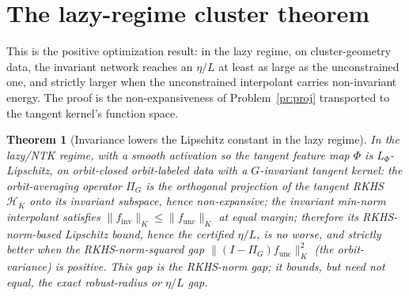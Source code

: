 \documentclass[11pt]{article}
\theoremstyle{plain}
\newtheorem{theorem}{Theorem}[section]
\theoremstyle{definition}
\theoremstyle{remark}
\begin{document}
\section{The lazy-regime cluster theorem}\label{sec:lazy}

This is the positive optimization result: in the lazy regime, on cluster-geometry data, the invariant network reaches
an $\eta/L$ at least as large as the unconstrained one, and strictly larger when the unconstrained interpolant carries
non-invariant energy. The proof is the non-expansiveness of Problem~\ref{pr:proj} transported to the tangent kernel's
function space.

\begin{theorem}[Invariance lowers the Lipschitz constant in the lazy regime]\label{thm:lazy}
In the lazy/NTK regime, with a smooth activation so the tangent feature map $\Phi$ is $L_\Phi$-Lipschitz, on
orbit-closed orbit-labeled data with a $G$-invariant tangent kernel: the orbit-averaging operator $\Pi_G$ is the
orthogonal projection of the tangent RKHS $\mathcal H_K$ onto its invariant subspace, hence non-expansive; the
invariant min-norm interpolant satisfies $\|f_{\mathrm{inv}}\|_K\le\|f_{\mathrm{unc}}\|_K$ at equal margin; therefore
its RKHS-norm-based Lipschitz bound, hence the certified $\eta/L$, is no worse, and strictly better when the
RKHS-norm-squared gap $\|(I-\Pi_G)f_{\mathrm{unc}}\|_K^2$ (the orbit-variance) is positive. This gap is the RKHS-norm
gap; it bounds, but need not equal, the exact robust-radius or $\eta/L$ gap.
\end{theorem}
\end{document}
